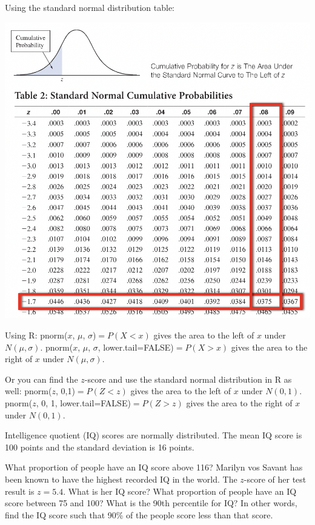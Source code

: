 Using the standard normal distribution table:

\includegraphics[width=0.75\tw]{07/07table.png} \medskip

\begin{tcolorbox}
Using R:
\bi
\ii pnorm($x$, $\mu$, $\sigma$)$=P(X<x)$ gives the area to the left of $x$ under $N(\mu,\sigma)$.
\ii pnorm($x$, $\mu$,  $\sigma$, lower.tail=FALSE)$=P(X>x)$ gives the area to the right of $x$ under $N(\mu,\sigma)$.
\ei \medskip

Or you can find the $z$-score and use the standard normal distribution in R as well:
\bi
\ii pnorm($z$, 0,1)$=P(Z<z)$ gives the area to the left of $x$ under $N(0,1)$.
\ii pnorm($z$, 0,  1, lower.tail=FALSE)$=P(Z>z)$ gives the area to the right of $x$ under $N(0,1)$.
\ei
\end{tcolorbox}

\clearpage


\bb[resume]
\ii Intelligence quotient (IQ) scores are normally distributed. The mean IQ score is 100 points and the standard deviation is 16 points.

\bb
\ii What proportion of people have an IQ score above 116? \vfill
\ii Marilyn vos Savant has been known to have the highest recorded IQ in the world.  The $z$-score of her test result is $z=5.4$.  What is her IQ score? \vfill
\ii What proportion of people have an IQ score between 75 and 100? \vfill
\ii What is the 90th percentile for IQ? In other words, find the IQ score such that 90\% of the people score less than that score. \vfill
\ee
\ee

